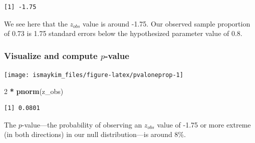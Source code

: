 \documentclass[12pt, krantz2,]{krantz}
\makeatletter
\newenvironment{Shaded}{\begin{snugshade}}{\end{snugshade}}
\newcommand{\DataTypeTok}[1]{\textcolor[rgb]{0.27,0.27,0.27}{#1}}
\newcommand{\DecValTok}[1]{\textcolor[rgb]{0.06,0.06,0.06}{#1}}
\newcommand{\FloatTok}[1]{\textcolor[rgb]{0.06,0.06,0.06}{#1}}
\newcommand{\KeywordTok}[1]{\textcolor[rgb]{0.27,0.27,0.27}{\textbf{#1}}}
\newcommand{\NormalTok}[1]{#1}
\newcommand{\OperatorTok}[1]{\textcolor[rgb]{0.43,0.43,0.43}{\textbf{#1}}}
\newcommand{\StringTok}[1]{\textcolor[rgb]{0.5,0.5,0.5}{#1}}
\newenvironment{kframe}{%
\medskip{}
\setlength{\fboxsep}{.8em}
 \def\at@end@of@kframe{}%
 \ifinner\ifhmode%
  \def\at@end@of@kframe{\end{minipage}}%
  \begin{minipage}{\columnwidth}%
 \fi\fi%
 \def\FrameCommand##1{\hskip\@totalleftmargin \hskip-\fboxsep
 \colorbox{shadecolor}{##1}\hskip-\fboxsep
     \hskip-\linewidth \hskip-\@totalleftmargin \hskip\columnwidth}%
 \MakeFramed {\advance\hsize-\width
   \@totalleftmargin\z@ \linewidth\hsize
   \@setminipage}}%
 {\par\unskip\endMakeFramed%
 \at@end@of@kframe}
\renewenvironment{Shaded}{\begin{kframe}}{\end{kframe}}
\makeatother
\begin{document}
\begin{verbatim}
[1] -1.75
\end{verbatim}

We see here that the \(z_{obs}\) value is around -1.75. Our observed sample proportion of 0.73 is 1.75 standard errors below the hypothesized parameter value of 0.8.

\hypertarget{visualize-and-compute-p-value}{%
\subsubsection*{\texorpdfstring{Visualize and compute \(p\)-value}{Visualize and compute p-value}}\label{visualize-and-compute-p-value}}


\begin{Shaded}
\end{Shaded}

\begin{center}\texttt{[image: ismaykim\_files/figure-latex/pvaloneprop-1]} \end{center}

\begin{Shaded}
\begin{Highlighting}[]
\DecValTok{2} \OperatorTok{*}\StringTok{ }\KeywordTok{pnorm}\NormalTok{(z_obs)}
\end{Highlighting}
\end{Shaded}

\begin{verbatim}
[1] 0.0801
\end{verbatim}

The \(p\)-value---the probability of observing an \(z_{obs}\) value of -1.75 or more extreme (in both directions) in our null distribution---is around 8\%.
\end{document}
